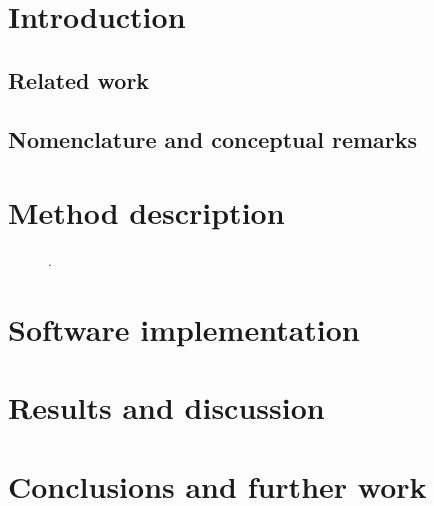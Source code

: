 \documentclass[runningheads]{llncs}
\begin{document}
\section{Introduction}
\subsection{Related work}

\subsection{Nomenclature and conceptual remarks}

\section{Method description}\label{sec:des}
\begin{figure}[!h]\centering
  \caption{.
  }\label{fig:glob}
\end{figure}

\noindent 
\section{Software implementation}\label{sec:imp}

\section{Results and discussion}

\section{Conclusions and further work}\label{sec:con}
\end{document}
